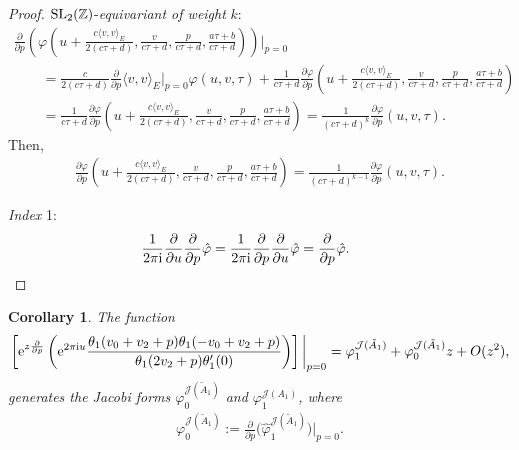 \documentclass[10pt,a4paper]{amsart}
\numberwithin{equation}{section}
\newtheorem{Corollary}[Theorem]{Corollary}
\newcommand{\Ja}{\mathcal{J}}
\begin{document}
\begin{proof}
${\rm SL}_2(\mathbb{Z})$-\emph{equivariant of weight} $k$:
\begin{gather*}
\frac{\partial}{\partial p}\left(\varphi\left(u+\frac{c\langle v,v \rangle_{E}}{2(c\tau+d)},\frac{v}{c\tau+d},\frac{p}{c\tau+d},\frac{a\tau+b}{c\tau+d}\right) \right)\bigg |_{p=0}
\\ \qquad
=\frac{c}{2(c\tau\! +d)}\frac{\partial}{\partial p} \langle v, v\rangle_E \bigg |_{p=0}\!\varphi(u,v,\tau)\!+\!\frac{1}{c\tau\!+d}\frac{\partial \varphi}{\partial p}\left(\!u + \frac{c\langle v,v \rangle_{E}}{2(c\tau\!+d)},\frac{v}{c\tau\!+d},\frac{p}{c\tau\!+d},\frac{a\tau\!+b}{c\tau\!+d}\right)
\\ \qquad
=\frac{1}{c\tau+d}\frac{\partial \varphi}{\partial p}\left(u+\frac{c\langle v,v \rangle_{E}}{2(c\tau+d)},\frac{v}{c\tau+d},\frac{p}{c\tau+d},\frac{a\tau+b}{c\tau+d}\right)
=\frac{1}{(c\tau+d)^k}\frac{\partial \varphi}{\partial p}(u,v,\tau).
\end{gather*}
Then,
\begin{gather*}
\frac{\partial \varphi}{\partial p}\left(u+\frac{c\langle v,v \rangle_{E}}{2(c\tau+d)},\frac{v}{c\tau+d},\frac{p}{c\tau+d},\frac{a\tau+b}{c\tau+d}\right)
=\frac{1}{(c\tau+d)^{k-1}}\frac{\partial \varphi}{\partial p}(u,v,\tau).
\end{gather*}

\emph{Index} 1:
\begin{gather*}
\frac{1}{2\pi {\rm i}}\frac{\partial}{\partial u}\frac{\partial}{\partial p}\hat\varphi=\frac{1}{2\pi {\rm i}}\frac{\partial}{\partial p}\frac{\partial}{\partial u}\hat\varphi=\frac{\partial}{\partial p}\hat\varphi.
\tag*{\qed}
\end{gather*}
\renewcommand{\qed}{}
\end{proof}

\begin{Corollary}
The function
\begin{gather*}
\left[ {\rm e}^{z\frac{\partial}{\partial p} } \left({\rm e}^{2\pi {\rm i} u}\frac{\theta_1(v_0+v_2+p)\theta_1(-v_0+v_2+p)}{\theta_1(2v_2+p)\theta_1^{\prime}(0)}\right) \right]\bigg |_{p=0}=\varphi_1^{\Ja(\tilde A_1)}+\varphi_0^{\Ja(\tilde A_1)}z+O(z^2),
\end{gather*}
generates the Jacobi forms $\varphi_0^{\Ja(\tilde A_1)}$ and $\varphi_1^{\Ja(A_1)}$,
where
\begin{gather*}
\varphi_0^{\Ja(\tilde A_1)}:=\frac{\partial }{\partial p}\big(\hat\varphi_1^{\Ja(\tilde A_1)} \big)\bigg |_{p=0}.
\end{gather*}
\end{Corollary}
\end{document}
